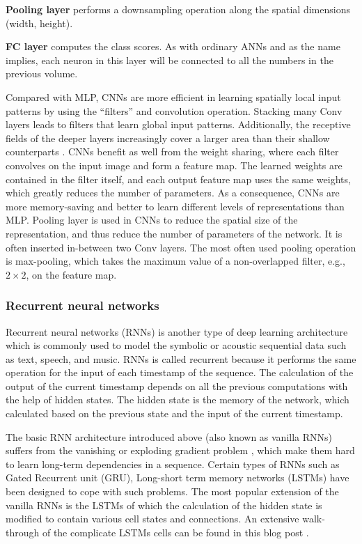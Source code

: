\noindent\textbf{Pooling layer} performs a downsampling operation along the spatial dimensions (width, height).

\noindent\textbf{FC layer} computes the class scores. As with ordinary ANNs and as the name implies, each neuron in this layer will be connected to all the numbers in the previous volume.

Compared with MLP, CNNs are more efficient in learning spatially local input patterns by using the ``filters” and convolution operation. Stacking many Conv layers leads to filters that learn global input patterns. Additionally, the receptive fields of the deeper layers increasingly cover a larger area than their shallow counterparts \cite{Wikipediaa}. CNNs benefit as well from the weight sharing, where each filter convolves on the input image and form a feature map. The learned weights are contained in the filter itself, and each output feature map uses the same weights, which greatly reduces the number of parameters. As a consequence, CNNs are more memory-saving and better to learn different levels of representations than MLP.
Pooling layer is used in CNNs to reduce the spatial size of the representation, and thus reduce the number of parameters of the network. It is often inserted in-between two Conv layers. The most often used pooling operation is max-pooling, which takes the maximum value of a non-overlapped filter, e.g., $2\times2$, on the feature map. 

\subsubsection{Recurrent neural networks}

Recurrent neural networks (RNNs) is another type of deep learning architecture which is commonly used to model the symbolic or acoustic sequential data such as text, speech, and music. RNNs is called recurrent because it performs the same operation for the input of each timestamp of the sequence. The calculation of the output of the current timestamp depends on all the previous computations with the help of hidden states. The hidden state is the memory of the network, which calculated based on the previous state and the input of the current timestamp. 

The basic RNN architecture introduced above (also known as vanilla RNNs) suffers from the vanishing or exploding gradient problem \cite{Pascanu2013}, which make them hard to learn long-term dependencies in a sequence. Certain types of RNNs such as Gated Recurrent unit (GRU), Long-short term memory networks (LSTMs) have been designed to cope with such problems. The most popular extension of the vanilla RNNs is the LSTMs \cite{Hochreiter1997} of which the calculation of the hidden state is modified to contain various cell states and connections. An extensive walk-through of the complicate LSTMs cells can be found in this blog post \cite{Olah2015}. 

